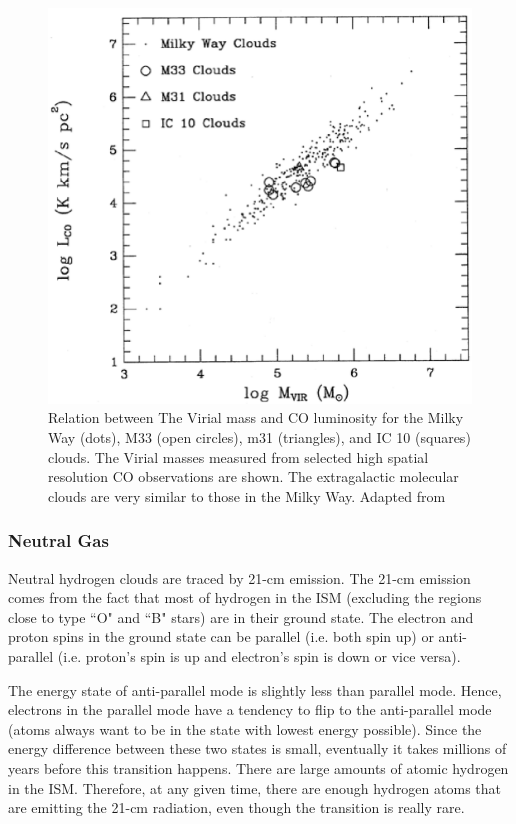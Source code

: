 \begin{figure}[h]
\label{fig: mco}
\centering
\includegraphics[width=16cm]{../image_intro/mvirial_lco.eps}
\caption{Relation between The Virial mass and CO luminosity for the Milky Way (dots), M33 (open circles), m31 (triangles), and IC 10 (squares) clouds. The Virial masses measured from selected high spatial resolution CO observations are shown. The extragalactic molecular clouds are very similar to those in the Milky Way. Adapted from \cite{Young91}}
\end{figure}
 

\subsubsection*{Neutral Gas}

Neutral hydrogen clouds are traced by 21-cm emission. The 21-cm emission comes from the fact that most of hydrogen in the ISM (excluding the regions close to type ``O" and ``B" stars) are in their ground state. The electron and proton spins in the ground state can be parallel (i.e. both spin up) or anti-parallel (i.e. proton's spin is up and electron's spin is down or vice versa). 

The energy state of anti-parallel mode is slightly less than parallel mode. Hence, electrons in the parallel mode have a tendency to flip to the anti-parallel mode (atoms always want to be in the state with lowest energy possible). Since the energy difference between these two states is small, eventually it takes millions of years before this transition happens. There are large amounts of atomic hydrogen in the ISM. Therefore, at any given time, there are enough hydrogen atoms that are emitting the 21-cm radiation, even though the transition is really rare. 

